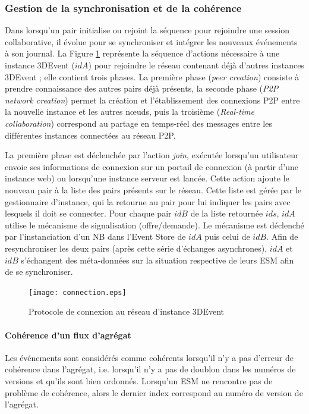 \subsubsection{Gestion de la synchronisation et de la cohérence}
Dans \cite{Desprat2017} lorsqu'un pair initialise ou rejoint la séquence pour 
rejoindre une session collaborative, il évolue pour se synchroniser et intégrer les 
nouveaux événements à son journal.
La Figure \ref{fig:connexionpairs} représente la séquence d'actions nécessaire à 
une instance 3DEvent ($idA$) pour rejoindre le réseau contenant déjà d'autres 
instances 3DEvent ; elle contient trois phases. La première phase (\textit{peer 
creation}) consiste à prendre connaissance des autres pairs déjà présents, la 
seconde phase (\textit{P2P network creation}) permet la création et l'établissement 
des connexions \gls{P2P} entre la nouvelle instance et les autres n\oe uds, puis la 
troisième (\textit{Real-time collaboration}) correspond au partage en temps-réel 
des messages entre les différentes instances connectées au réseau \gls{P2P}.

La première phase est déclenchée par l'action \textit{join}, exécutée lorsqu'un 
utilisateur envoie ses informations de connexion sur un portail de connexion (à 
partir d'une instance 
web) ou lorsqu'une instance serveur est lancée. Cette action ajoute le nouveau 
pair à la liste des pairs présents sur le réseau. Cette liste est gérée par le 
gestionnaire d'instance, qui la retourne au pair pour lui indiquer les pairs 
avec lesquels il doit se connecter.
Pour chaque pair $idB$ de la liste retournée $ids$, $idA$ utilise le mécanisme de 
signalisation (offre/demande). Le mécanisme est déclenché par l'instanciation d'un 
\gls{NB} dans l'Event Store de $idA$ puis celui de $idB$. Afin de resynchroniser 
les deux pairs (après cette série d'échanges asynchrones), $idA$ et $idB$ 
s'échangent des méta-données sur la situation respective de leurs \gls{ESM} 
afin de se synchroniser.

\begin{figure}[h]
	\noindent
	\centering
	\texttt{[image: connection.eps]}
	\caption{Protocole de connexion au réseau d'instance 3DEvent}
	\label{fig:connexionpairs}
\end{figure}

\paragraph{Cohérence d'un flux d'agrégat}
Les événements sont considérés comme \og cohérents\fg{}  lorsqu'il n'y a pas 
d'erreur de cohérence dans l'agrégat, i.e. lorsqu'il n'y a pas de doublon dans les 
numéros de versions et qu'ils sont bien ordonnés. Lorsqu'un \gls{ESM} ne 
rencontre pas de problème de cohérence, alors le 
dernier index correspond au numéro de version de l'agrégat. 

